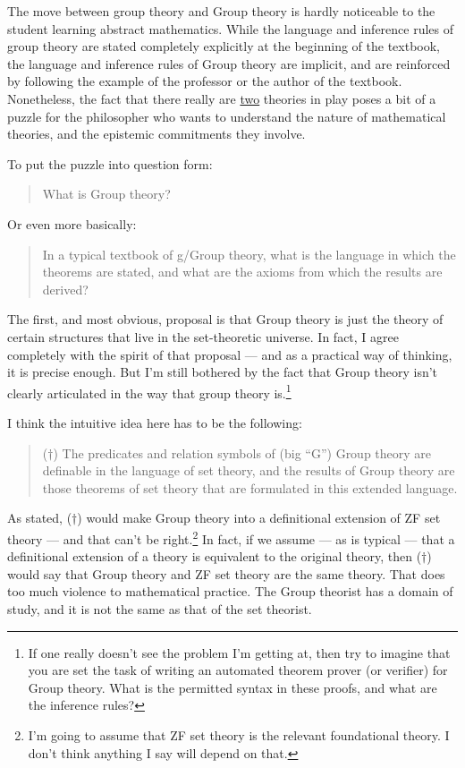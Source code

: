 \documentclass[12pt,fleqn]{article}
\begin{document}
The move between group theory and Group theory is hardly noticeable to
the student learning abstract mathematics. While the language and
inference rules of group theory are stated completely explicitly at
the beginning of the textbook, the language and inference rules of
Group theory are implicit, and are reinforced by following the example
of the professor or the author of the textbook. Nonetheless, the fact
that there really are \underline{two} theories in play poses a bit of
a puzzle for the philosopher who wants to understand the nature of
mathematical theories, and the epistemic commitments they involve.

To put the puzzle into question form:
\begin{quote} What is Group theory? \end{quote} Or even more
basically:
\begin{quote} In a typical textbook of g/Group theory, what is the
  language in which the theorems are stated, and what are the axioms
  from which the results are derived? \end{quote} The first, and most
obvious, proposal is that Group theory is just the theory of certain
structures that live in the set-theoretic universe. In fact, I agree
completely with the spirit of that proposal --- and as a practical way
of thinking, it is precise enough. But I'm still bothered by the fact
that Group theory isn't clearly articulated in the way that group
theory is.\footnote{If one really doesn't see the problem I'm getting
  at, then try to imagine that you are set the task of writing an
  automated theorem prover (or verifier) for Group theory. What is the
  permitted syntax in these proofs, and what are the inference rules?}

I think the intuitive idea here has to be the following:
\begin{quote}
  ($\dagger$) The predicates and relation symbols of (big ``G'') Group
  theory are definable in the language of set theory, and the results
  of Group theory are those theorems of set theory that are formulated
  in this extended language. \end{quote} As stated, ($\dagger$) would
make Group theory into a definitional extension of ZF set theory ---
and that can't be right.\footnote{I'm going to assume that ZF set
  theory is the relevant foundational theory. I don't think anything I
  say will depend on that.} In fact, if we assume --- as is typical
--- that a definitional extension of a theory is equivalent to the
original theory, then ($\dagger$) would say that Group theory and ZF
set theory are the same theory. That does too much violence to
mathematical practice. The Group theorist has a domain of study, and
it is not the same as that of the set theorist.
\end{document}
